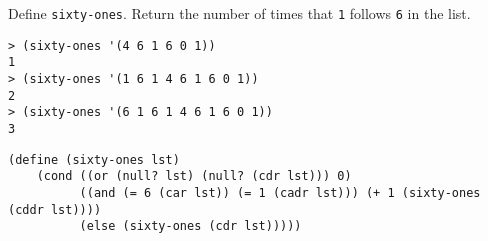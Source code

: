 \begin{blocksection}
\question Define \lstinline$sixty-ones$. Return the number of times that \lstinline$1$
follows \lstinline$6$ in the list.

\begin{lstlisting}
> (sixty-ones '(4 6 1 6 0 1))
1
> (sixty-ones '(1 6 1 4 6 1 6 0 1))
2
> (sixty-ones '(6 1 6 1 4 6 1 6 0 1))
3
\end{lstlisting}

\begin{solution}[1.5in]
\begin{lstlisting}
(define (sixty-ones lst)
    (cond ((or (null? lst) (null? (cdr lst))) 0)
          ((and (= 6 (car lst)) (= 1 (cadr lst))) (+ 1 (sixty-ones (cddr lst))))
          (else (sixty-ones (cdr lst)))))
\end{lstlisting}
\end{solution}
\end{blocksection}

